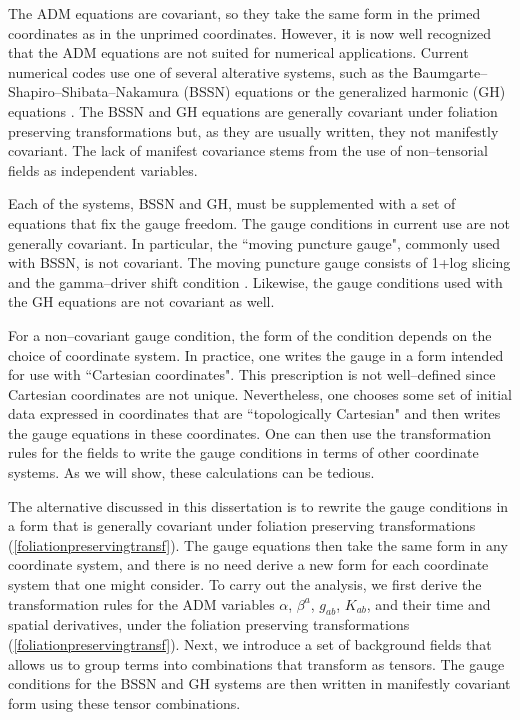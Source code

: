 The ADM equations are covariant, so they take the same form in the primed coordinates as in the unprimed coordinates. However, it is now 
well recognized that the ADM equations 
are not suited for numerical applications. Current numerical codes use one of several alterative systems, such as the 
Baumgarte--Shapiro--Shibata--Nakamura (BSSN) equations \cite{Shibata:1995we,Baumgarte:1998te} or the generalized harmonic (GH) 
equations \cite{Friedrich:1985,Garfinkle:2001ni}.
The BSSN and GH equations are generally covariant under foliation preserving transformations but, as they are usually written, 
they not manifestly covariant. The lack of manifest covariance stems from the use of non--tensorial fields as independent variables. 

Each of the systems, BSSN and GH, must be supplemented with a set of equations that fix the gauge freedom. 
The gauge conditions in current use are not generally covariant. In particular, the ``moving puncture gauge", commonly used with BSSN, is not covariant. 
The moving puncture gauge consists of 1+log slicing \cite{Bona:1994dr} and the
gamma--driver shift condition \cite{Alcubierre:2002kk}.  Likewise, the gauge conditions used 
with the GH equations \cite{Pretorius:2006tp,Szilagyi:2009qz, Lindblom:2009tu} are not covariant as well.  

For a non--covariant gauge condition, the form of the condition depends on the choice of coordinate system. 
In practice, one writes the gauge  in a form intended for use with ``Cartesian coordinates". This prescription is not  well--defined 
since Cartesian coordinates are not unique. Nevertheless, one chooses some set of initial data expressed in coordinates that are ``topologically Cartesian"  
and then writes the gauge equations in these coordinates.  One can then use the transformation rules for the fields to write the gauge conditions in terms of 
other coordinate systems. As we will show, these calculations can be tedious. 

The alternative discussed in this dissertation is to rewrite the gauge conditions in a form that is generally covariant under foliation preserving 
transformations (\ref{foliationpreservingtransf}). The gauge equations then take the same form in any coordinate system, and there is no need derive a new form 
for each coordinate system that one might consider. To carry out the analysis, we first derive the transformation rules for the ADM variables $\alpha$, $\beta^a$, 
$g_{ab}$, $K_{ab}$, and their time and spatial derivatives, under the foliation preserving transformations (\ref{foliationpreservingtransf}). Next, we introduce a 
set of background fields that allows us to group terms into combinations that transform as tensors. The gauge conditions for the BSSN and GH systems are 
then written in manifestly covariant form using these tensor combinations. 

